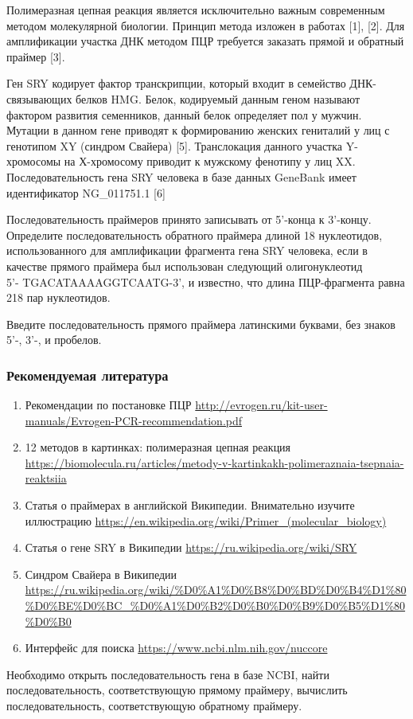
Полимеразная цепная реакция является исключительно важным современным методом молекулярной биологии. Принцип метода изложен в работах [1], [2]. Для амплификации участка ДНК методом ПЦР требуется заказать прямой и обратный праймер [3].

Ген SRY кодирует фактор транскрипции, который входит в семейство ДНК-связывающих белков HMG. 
Белок, кодируемый данным геном называют фактором развития семенников, данный белок определяет 
пол у мужчин. Мутации в данном гене приводят к формированию женских гениталий у лиц с генотипом 
XY (синдром Свайера) [5]. Транслокация данного участка Y-хромосомы на Х-хромосому приводит 
к мужскому фенотипу у лиц XX. Последовательность гена SRY человека в базе данных GeneBank 
имеет идентификатор NG\_011751.1 [6]

Последовательность праймеров принято записывать от 5'-конца к 3'-концу. Определите последовательность обратного праймера длиной 18 
нуклеотидов, использованного для амплификации фрагмента гена SRY человека, если в 
качестве прямого праймера был использован следующий олигонуклеотид\\ 5'- TGACATAAAAGGTCAATG-3', и известно, что длина ПЦР-фрагмента равна 218 пар нуклеотидов.

Введите последовательность прямого праймера латинскими буквами, без знаков 5'-, 3'-, и пробелов.

\subsubsection*{Рекомендуемая литература}

\begin{enumerate}
    \item Рекомендации по постановке ПЦР \url{http://evrogen.ru/kit-user-manuals/Evrogen-PCR-recommendation.pdf}
    \item 12 методов в картинках: полимеразная цепная реакция \url{https://biomolecula.ru/articles/metody-v-kartinkakh-polimeraznaia-tsepnaia-reaktsiia}
    \item Статья о праймерах в английской Википедии. Внимательно изучите иллюстрацию \url{https://en.wikipedia.org/wiki/Primer_(molecular_biology)}
    \item Статья о гене SRY в Википедии \url{https://ru.wikipedia.org/wiki/SRY}
    \item Синдром Свайера в Википедии \url{https://ru.wikipedia.org/wiki/%D0%A1%D0%B8%D0%BD%D0%B4%D1%80%D0%BE%D0%BC_%D0%A1%D0%B2%D0%B0%D0%B9%D0%B5%D1%80%D0%B0}
    \item Интерфейс для поиска \url{https://www.ncbi.nlm.nih.gov/nuccore}
\end{enumerate}

\explanationSection

Необходимо открыть последовательность гена в базе NCBI, найти последовательность, соответствующую прямому праймеру, вычислить последовательность, соответствующую обратному праймеру.

